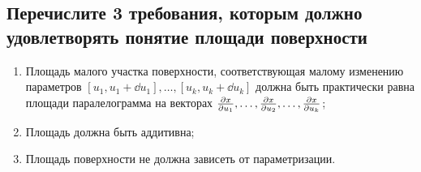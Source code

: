 
\subsection{Перечислите 3 требования, которым должно удовлетворять понятие площади поверхности}

\begin{enumerate}
    \item Площадь малого участка поверхности, соответствующая малому изменению параметров $[u_{1}, u_{1} + \dd u_{1}], \ldots, [u_{k}, u_{k} + \dd u_{k}]$ должна быть практически равна площади паралелограмма на векторах $\pdv{x}{u_{1}}, \ldots, \pdv{x}{u_{2}}, \ldots, \pdv{x}{u_{k}}$;
    \item Площадь должна быть аддитивна;
    \item Площадь поверхности не должна зависеть от параметризации.
\end{enumerate}